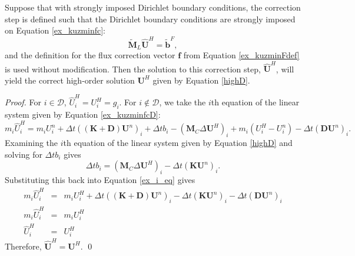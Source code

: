 \begin{lemma}
   Suppose that with strongly imposed Dirichlet boundary conditions, the
   correction step is defined such that the Dirichlet boundary conditions
   are strongly imposed on Equation \ref{ex_kuzminfc}:
   \begin{equation}\label{ex_kuzminfcD}
      \tilde{\mathbf{M}}_L\hat{\mathbf{U}}^H
         = \tilde{\mathbf{b}}^F,
   \end{equation}
   and the definition for
   the flux correction vector $\mathbf{f}$ from
   Equation \ref{ex_kuzminFdef} is used without modification. Then the solution
   to this correction step, $\hat{\mathbf{U}}^H$, will yield the
   correct high-order solution $\mathbf{U}^H$ given by Equation \ref{highD}.
\end{lemma}
\begin{proof}
   For $i\in\mathcal{D}$, $\hat{U}^H_i = U^H_i = g_i$. For $i\notin\mathcal{D}$,
   we take the $i$th equation of the linear system given by Equation \ref{ex_kuzminfcD}:
   \begin{equation}\label{ex_i_eq}
      m_i\hat{U}^H_i
         = m_i U^n_i + \Delta t((\mathbf{K}+\mathbf{D})\mathbf{U}^n)_i + \Delta t b_i - (\mathbf{M}_C\Delta\mathbf{U}^H)_i
         + m_i(U^H_i-U^n_i) - \Delta t(\mathbf{D}\mathbf{U}^n)_i.
   \end{equation}
   Examining the $i$th equation of the linear system given by Equation \ref{highD}
   and solving for $\Delta t b_i$ gives
   \begin{equation}
      \Delta t b_i = (\mathbf{M}_C\Delta\mathbf{U}^H)_i
         - \Delta t(\mathbf{K}\mathbf{U}^n)_i.
   \end{equation}
   Substituting this back into Equation \ref{ex_i_eq} gives
   \begin{eqnarray}
      m_i\hat{U}^H_i & = & m_i U^H_i + \Delta t((\mathbf{K}+\mathbf{D})\mathbf{U}^n)_i
         - \Delta t(\mathbf{K}\mathbf{U}^n)_i - \Delta t(\mathbf{D}\mathbf{U}^n)_i\\
      m_i\hat{U}^H_i & = & m_i U^H_i\\
      \hat{U}^H_i & = & U^H_i
   \end{eqnarray}
   Therefore, $\hat{\mathbf{U}}^H = \mathbf{U}^H$.
   \qed
\end{proof}
